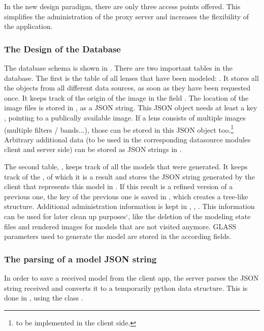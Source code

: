 In the new design paradigm, there are only three access points offered. This simplifies the administration of the proxy server and increases the flexibility of the application.




\subsubsection{The Design of the Database}



The database schema is shown in .
There are two important tables in the database.
The first is the table of all lenses that have been modeled: .
It stores all the objects from all different data sources, as soon as they have been requested once.
It keeps track of the origin of the image in the field .
The location of the image files is stored in , as a JSON string.
This JSON object needs at least a key , pointing to a publically available image.
If a lens consists of multiple images (multiple filters / bands...), those can be stored in this JSON object too.\footnote{to be implemented in the client side.}
Arbitrary additional data (to be used in the corresponding datasource modules client and server side) can be stored as JSON strings in .

The second table, , keeps track of all the models that were generated.
It keeps track of the , of which it is a result and stores the JSON string generated by the client that represents this model in .
If this result is a refined version of a previous one, the key of the previous one is saved in , which creates a tree-like structure.
Additional administration information is kept in , , .
This information can be used for later clean up purposes`, like the deletion of the modeling state files and rendered images for models that are not visited anymore.
GLASS parameters used to generate the model are stored in the according fields.


\subsubsection{The parsing of a model JSON string}

In order to save a received model from the client app, the server parses the JSON string received and converts it to a temporarily python data structure.
This is done in , using the class .

